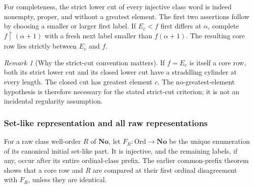 \documentclass[11pt]{article}
\theoremstyle{definition}
\theoremstyle{remark}
\newtheorem{remark}[remark]{Remark}
\newcommand{\No}{\mathbf{No}}
\newcommand{\Ord}{\mathrm{Ord}}
\begin{document}
For completeness, the strict lower cut of every injective class word
is indeed nonempty, proper, and without a greatest element.  The
first two assertions follow by choosing a smaller or larger first
label.  If $E_c<f$ first differs at $\alpha$, complete
$f\restriction(\alpha+1)$ with a fresh next label smaller than
$f(\alpha+1)$.  The resulting core row lies strictly between
$E_c$ and $f$.

\begin{remark}[Why the strict-cut convention matters]\label{swo:sh:n15.2}
If $f=E_c$ is itself a core row, both its strict lower cut and its
closed lower cut have a straddling cylinder at every length.  The
closed cut has greatest element $c$.  The no-greatest-element
hypothesis is therefore necessary for the stated strict-cut
criterion; it is not an incidental regularity assumption.
\end{remark}

\subsubsection{Set-like representation and all raw representations}

For a raw class well-order $R$ of $\No$, let
$F_R:\Ord\to\No$ be the unique enumeration of
its canonical initial set-like part.  It is injective, and the
remaining labels, if any, occur after its entire ordinal-class prefix.
The earlier common-prefix theorem shows that a core row and $R$
are compared at their first ordinal disagreement with $F_R$,
unless they are identical.
\end{document}
